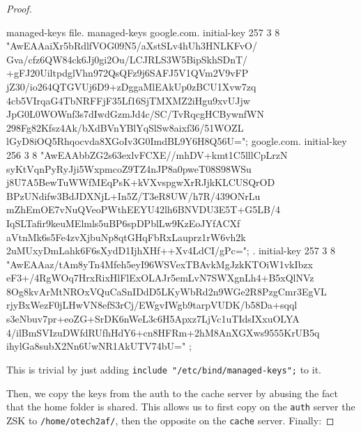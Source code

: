 \documentclass[a4paper,11pt,hidelinks]{article}
\begin{document}
\begin{proof}
\begin{code}{managed-keys file.}
managed-keys {
google.com. initial-key 257 3 8 "AwEAAaiXr5bRdlfVOG09N5/aXstSLv4hUh3HNLKFvO/
                                Gva/cfz6QW84ck6Jj0gi2Ou/LCJRLS3W5BipSkhSDnT/
                                +gFJ20UiltpdglVhn972QsQFz9j6SAFJ5V1QVm2V9vFP
                                jZ30/io264QTGVUj6D9+zDggaMlEAkUp0zBCU1Xvw7zq
                                4cb5VIrqaG4TbNRFFjF35Lf16SjTMXMZ2iHgu9xvUJjw
                                JpG0L0WOWnf3s7dIwdGzmJd4c/SC/TvRqcgHCBywnfWN
                                298Fg82Kfsz4Ak/bXdBVnYBlYqSlSw8aixf36/51WOZL
                                lGyD8iOQ5Rhqocvda8XGoIv3G0ImdBL9Y6H8Q56U=";
google.com. initial-key 256 3 8 "AwEAAbbZG2s63exlvFCXE//mhDV+kmt1C5lllCpLrzN
                                syKtVqnPyRyJji5WxpmcoZ9TZ4nJP8a0pweT08S98WSu
                                j8U7A5BewTuWWfMEqPsK+kVXvspgwXrRJjkKLCUSQrOD
                                BPzUNdifw3BdJDXNjL+In5Z/T3eR8UW/h7R/439ONrLu
                                mZhEmOE7vNuQVeoPWthEEYU42lh6BNVDU3E5T+G5LB/4
                                IqSLTafir9keuMElmls5uBP6spDPblLw9KzEoJYfACXf
                                aVtnMk6s5Fe4zvXjbuNp8qtGHqFbRxLauprz1rW6vh2k
                                2uMUxyDmLahk6F6sXydD1IjhXHf++Xv4LdCI/gPc=";
. initial-key 257 3 8 "AwEAAaz/tAm8yTn4Mfeh5eyI96WSVexTBAvkMgJzkKTOiW1vkIbzx
                       eF3+/4RgWOq7HrxRixHlFlExOLAJr5emLvN7SWXgnLh4+B5xQlNVz
                       8Og8kvArMtNROxVQuCaSnIDdD5LKyWbRd2n9WGe2R8PzgCmr3EgVL
                       rjyBxWezF0jLHwVN8efS3rCj/EWgvIWgb9tarpVUDK/b58Da+sqql
                       s3eNbuv7pr+eoZG+SrDK6nWeL3c6H5Apxz7LjVc1uTIdsIXxuOLYA
                       4/ilBmSVIzuDWfdRUfhHdY6+cn8HFRm+2hM8AnXGXws9555KrUB5q
                       ihylGa8subX2Nn6UwNR1AkUTV74bU="
};
\end{code}

This is trivial by just adding \verb=include "/etc/bind/managed-keys";= to it.

Then, we copy the keys from the auth to the cache server by abusing the fact that the home folder is shared. This allows us to first copy on the \verb=auth= server the ZSK to \verb=/home/otech2af/=, then the opposite on the \verb=cache= server. Finally:


\end{proof}
\end{document}
